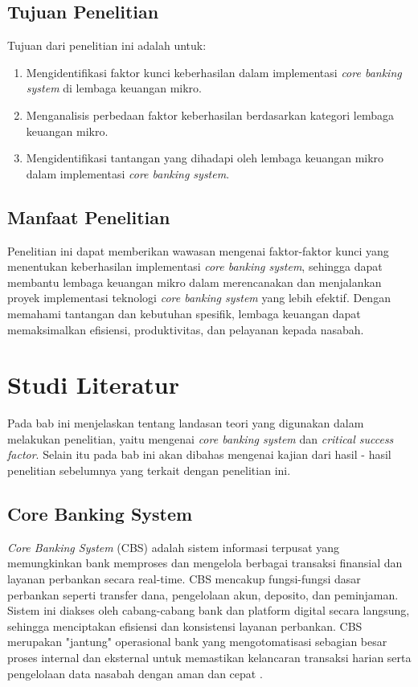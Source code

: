 \documentclass[journal,article,submit,pdftex,moreauthors]{Definitions/mdpi}
\begin{document}
\subsection{Tujuan Penelitian}
Tujuan dari penelitian ini adalah untuk:
\begin{enumerate}
    \item Mengidentifikasi faktor kunci keberhasilan dalam implementasi \textit{core banking system} di lembaga keuangan mikro.
    \item Menganalisis perbedaan faktor keberhasilan berdasarkan kategori lembaga keuangan mikro.
    \item Mengidentifikasi tantangan yang dihadapi oleh lembaga keuangan mikro dalam implementasi \textit{core banking system}.
\end{enumerate}

\subsection{Manfaat Penelitian}
Penelitian ini dapat memberikan wawasan mengenai faktor-faktor kunci yang menentukan keberhasilan implementasi \textit{core banking system}, sehingga dapat membantu lembaga keuangan mikro dalam merencanakan dan menjalankan proyek implementasi teknologi \textit{core banking system} yang lebih efektif. Dengan memahami tantangan dan kebutuhan spesifik, lembaga keuangan dapat memaksimalkan efisiensi, produktivitas, dan pelayanan kepada nasabah.




\section{Studi Literatur} \label{sec:Studi Literatrur}

Pada bab ini menjelaskan tentang landasan teori yang digunakan dalam melakukan penelitian, yaitu mengenai \textit{core banking system} dan \textit{critical success factor}. Selain itu pada bab ini akan dibahas mengenai kajian dari hasil - hasil penelitian sebelumnya yang terkait dengan penelitian ini.

\subsection{Core Banking System} \label{sec:Core Banking System}

\textit{Core Banking System} (CBS) adalah sistem informasi terpusat yang memungkinkan bank memproses dan mengelola berbagai transaksi finansial dan layanan perbankan secara real-time. CBS mencakup fungsi-fungsi dasar perbankan seperti transfer dana, pengelolaan akun, deposito, dan peminjaman. Sistem ini diakses oleh cabang-cabang bank dan platform digital secara langsung, sehingga menciptakan efisiensi dan konsistensi layanan perbankan. CBS merupakan "jantung" operasional bank yang mengotomatisasi sebagian besar proses internal dan eksternal untuk memastikan kelancaran transaksi harian serta pengelolaan data nasabah dengan aman dan cepat \cite{Hsiao-ebanking}.
\end{document}
